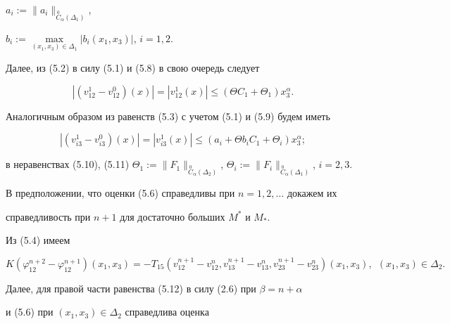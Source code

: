 $a_i:=\|a_i\|_{\overset{0}{C}_{\alpha}(\Delta_1)}$,


$b_i:=\max\limits_{(x_1,x_3)\in \Delta_1}|b_i(x_1,x_3)|$, $i=1,2$.


Далее, из (5.2) в силу (5.1) и (5.8) в свою очередь следует




\begin{equation}


|(v_{12}^1-v_{12}^0)(x)|=|v_{12}^1(x)|\leq (\Theta C_1+\Theta_1)x_3^{\alpha}.


\end{equation}


Аналогичным образом из равенств (5.3) с учетом (5.1) и (5.9) будем иметь




\begin{equation}


|(v_{i3}^1-v_{i3}^0)(x)|=|v_{i3}^1(x)|\leq (a_i+\Theta b_iC_1+\Theta_i)x_3^


{\alpha};


\end{equation}


в неравенствах (5.10), (5.11) $\Theta_1:=\|F_1\|_{\overset{0}{C}_{\alpha}(


\Delta_2)}$, $\Theta_i:=\|F_i\|_{\overset{0}{C}_{\alpha}(\Delta_1)}$, $i=2,3$.





В предположении, что оценки (5.6) справедливы при $n=1,2,\dotsc$ докажем их


справедливость при $n+1$ для достаточно больших $M^*$ и $M_*$.





Из (5.4) имеем




\begin{equation}


K(\varphi_{12}^{n+2}-\varphi_{12}^{n+1})(x_1,x_3)=-T_{15}(v_{12}^{n+1}-


v_{12}^n,v_{13}^{n+1}-v_{13}^n,v_{23}^{n+1}-v_{23}^n)(x_1,x_3),\ \ (x_1,x_3)


\in \Delta_2.


\end{equation}


Далее, для правой части равенства (5.12) в силу (2.6) при $\beta = n+\alpha$


и (5.6) при $(x_1,x_3)\in \Delta_2 $ справедлива оценка


